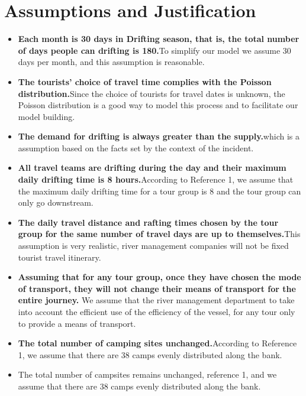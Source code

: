 \section{Assumptions and Justification}

\begin{itemize} 
	
    \item \textbf{Each month is 30 days in Drifting season, that is, the total number of days people can drifting is 180.}To simplify our model we assume 30 days per month, and this assumption is reasonable.
    
    \item \textbf{The tourists' choice of travel time complies with the Poisson distribution.}Since the choice of tourists for travel dates is unknown, the Poisson distribution is a good way to model this process and to facilitate our model building.
    
    \item \textbf{The demand for drifting is always greater than the supply.}which is a assumption based on the facts set by the context of the incident.
    
    \item \textbf{All travel teams are drifting during the day and their maximum daily drifting time is 8 hours.}According to Reference 1, we assume that the maximum daily drifting time for a tour group is 8 and the tour group can only go downstream.
    
    \item \textbf{The daily travel distance and rafting times chosen by the tour group for the same number of travel days are up to themselves.}This assumption is very realistic, river management companies will not be fixed tourist travel itinerary.
    
	\item \textbf{Assuming that for any tour group, once they have chosen the mode of transport, they will not change their means of transport for the entire journey. }We assume that the river management department to take into account the efficient use of the efficiency of the vessel, for any tour only to provide a means of transport.
	
	\item \textbf{The total number of camping sites unchanged.}According to Reference 1, we assume that there are 38 camps evenly distributed along the bank.
	
	\item The total number of campsites remains unchanged, reference 1, and we assume that there are 38 camps evenly distributed along the bank. 
\end{itemize}


